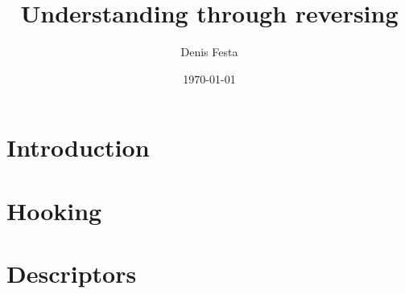 \documentclass[10pt, twocolumn, a4paper]{article}
\begin{document}
\title{Understanding through reversing}
\author{Denis Festa}
\date{\today}

\maketitle

\tableofcontents

\section{Introduction}
%
%
%
%
%
%
\section{Hooking}



\section{Descriptors}


\end{document}
